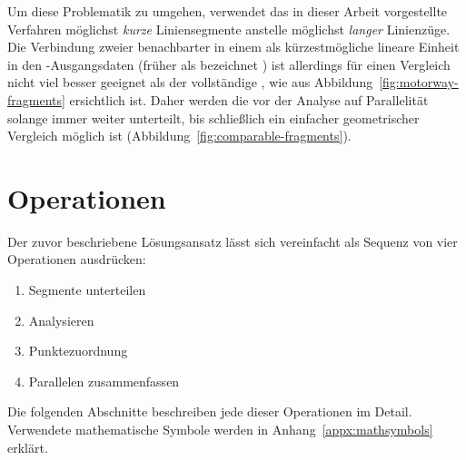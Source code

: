 \documentclass[../main/thesis.tex]{subfiles}
\begin{document}
Um diese Problematik zu umgehen, verwendet das in dieser Arbeit vorgestellte Verfahren möglichst \emph{kurze} Liniensegmente anstelle möglichst \emph{langer} Linienzüge.
Die Verbindung zweier benachbarter  in einem  als kürzestmögliche lineare Einheit in den \osm-Ausgangsdaten (früher als  bezeichnet ) ist allerdings für einen Vergleich nicht viel besser geeignet als der vollständige %
, wie aus Abbildung~\ref{fig:motorway-fragments} ersichtlich ist.
Daher werden die  vor der Analyse auf Parallelität solange immer weiter unterteilt, bis schließlich ein einfacher geometrischer Vergleich möglich ist (Abbildung~\ref{fig:comparable-fragments}).




\section{Operationen}
\label{ch:algorithm-parts}

Der zuvor beschriebene Lösungsansatz lässt sich vereinfacht als Sequenz von vier Operationen ausdrücken:
\begin{enumerate}[nosep]
	\item Segmente unterteilen
	\item Analysieren
	\item Punktezuordnung
	\item Parallelen zusammenfassen
\end{enumerate}
%
%
Die folgenden Abschnitte beschreiben jede dieser Operationen im Detail.
Verwendete mathematische Symbole werden in Anhang~\ref{appx:mathsymbols} erklärt.
\end{document}
